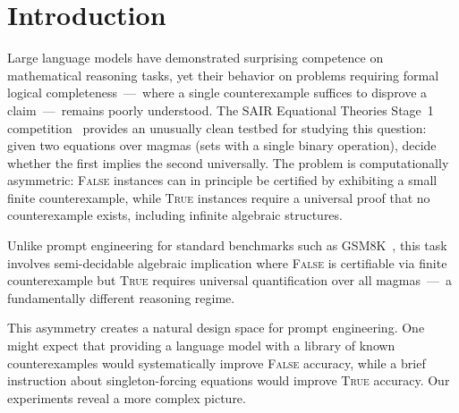 \documentclass[11pt]{article}
\begin{document}
\begin{abstract}
Post-submission validation against the SAIR official benchmark reveals
a cross-distribution trade-off surface: gains within the saturation
region are distribution-fragile, with our most engineered variant
(AN45c) falling below the no-cheatsheet baseline on the official
evaluation while the simpler predecessor (AN38) produces a robust
improvement. See Section~\ref{sec:official} for full analysis.

\textit{Note: This is a pre-competition-leaderboard version based on
Contributor Network data ($n=52$ voluntary submissions at competition
close, April~20, 2026). An updated analysis incorporating full
competition results ($n=1{,}007$) will follow after April~30, 2026.}
\end{abstract}

\section{Introduction}

Large language models have demonstrated surprising competence on
mathematical reasoning tasks, yet their behavior on problems requiring
formal logical completeness~---~where a single counterexample suffices
to disprove a claim~---~remains poorly understood. The SAIR Equational
Theories Stage~1 competition~\citep{tao2026sair} provides an unusually
clean testbed for studying this question: given two equations over magmas
(sets with a single binary operation), decide whether the first implies
the second universally. The problem is computationally asymmetric:
\textsc{False} instances can in principle be certified by exhibiting a
small finite counterexample, while \textsc{True} instances require a
universal proof that no counterexample exists, including infinite
algebraic structures.

Unlike prompt engineering for standard benchmarks such as
GSM8K~\citep{cobbe2021gsm8k}, this task involves semi-decidable
algebraic implication where \textsc{False} is certifiable via finite
counterexample but \textsc{True} requires universal quantification over
all magmas~---~a fundamentally different reasoning regime.

This asymmetry creates a natural design space for prompt engineering.
One might expect that providing a language model with a library of known
counterexamples would systematically improve \textsc{False} accuracy,
while a brief instruction about singleton-forcing equations would
improve \textsc{True} accuracy. Our experiments reveal a more complex
picture.
\end{document}
